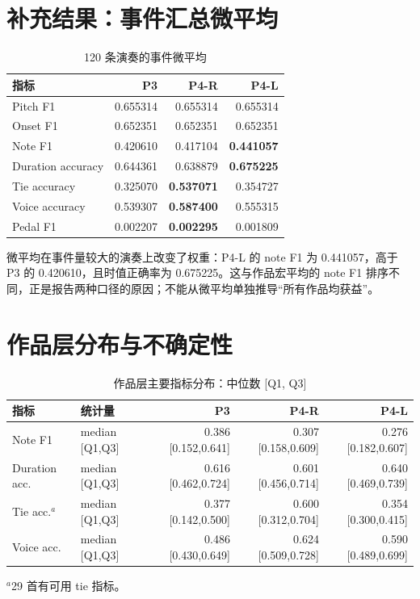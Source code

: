 \documentclass[UTF8,a4paper,11pt]{ctexart}
\newcommand{\best}[1]{\textbf{#1}}
\begin{document}
\section{补充结果：事件汇总微平均}
\begin{table}[h]
\centering
\caption{120 条演奏的事件微平均}
\small
\begin{tabular}{@{}lrrr@{}}
\toprule
指标 & P3 & P4-R & P4-L\\
\midrule
Pitch F1 & 0.655314 & 0.655314 & 0.655314\\
Onset F1 & 0.652351 & 0.652351 & 0.652351\\
Note F1 & 0.420610 & 0.417104 & \best{0.441057}\\
Duration accuracy & 0.644361 & 0.638879 & \best{0.675225}\\
Tie accuracy & 0.325070 & \best{0.537071} & 0.354727\\
Voice accuracy & 0.539307 & \best{0.587400} & 0.555315\\
Pedal F1 & 0.002207 & \best{0.002295} & 0.001809\\
\bottomrule
\end{tabular}
\end{table}

微平均在事件量较大的演奏上改变了权重：P4-L 的 note F1 为 0.441057，高于 P3 的 0.420610，且时值正确率为 0.675225。这与作品宏平均的 note F1 排序不同，正是报告两种口径的原因；不能从微平均单独推导“所有作品均获益”。

\section{作品层分布与不确定性}
\begin{table}[h]
\centering
\caption{作品层主要指标分布：中位数 [Q1, Q3]}
\small
\begin{tabular}{@{}llrrr@{}}
\toprule
指标 & 统计量 & P3 & P4-R & P4-L\\
\midrule
Note F1 & median [Q1,Q3] & 0.386 [0.152,0.641] & 0.307 [0.158,0.609] & 0.276 [0.182,0.607]\\
Duration acc. & median [Q1,Q3] & 0.616 [0.462,0.724] & 0.601 [0.456,0.714] & 0.640 [0.469,0.739]\\
Tie acc.$^{a}$ & median [Q1,Q3] & 0.377 [0.142,0.500] & 0.600 [0.312,0.704] & 0.354 [0.300,0.415]\\
Voice acc. & median [Q1,Q3] & 0.486 [0.430,0.649] & 0.624 [0.509,0.728] & 0.590 [0.489,0.699]\\
\bottomrule
\end{tabular}
\begin{flushleft}\footnotesize $^{a}$29 首有可用 tie 指标。\end{flushleft}
\end{table}
\end{document}
